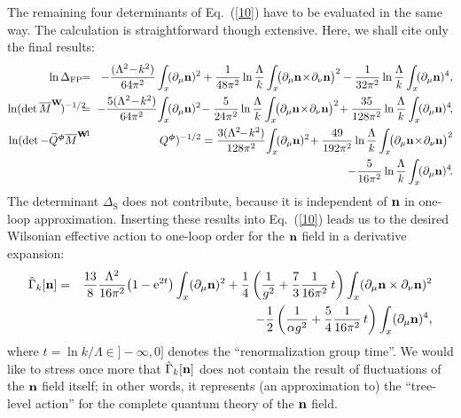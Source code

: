 \documentclass[a4paper,12pt]{article}
\newcommand{\E}{\text{e}}
\newcommand{\re}[1]{~(\ref{#1})}
\begin{document}
The remaining four determinants of Eq.\re{10} have to be evaluated in
the same way. The calculation is straightforward though
extensive. Here, we shall cite only the final results:
\begin{eqnarray}
\ln \Delta_{\text{FP}}\!\!&=&\!\! 
-\frac{(\Lambda^2\!-\!k^2)}{64\pi^2} \int_x \!(\partial_\mu\mn)^2 
+ \frac{1}{48\pi^2} \ln \frac{\Lambda}{k}\int_x\!  
  \bigl(\partial_\mu\mn\!\times\!\partial_\nu\mn\bigr)^2 
- \frac{1}{32\pi^2} \ln\frac{\Lambda}{k} \int_x \!(\partial_\mu\mn)^4,
\nonumber\\
\ln (\det\overline{M}^{\mW}\!)^{-1/2}\!\!\!\!
&=&\!\!\! -\frac{5 (\Lambda^2\!-\!k^2)}{64\pi^2}\! \int_x\!
  (\partial_\mu\mn)^2 \!
- \frac{5}{24\pi^2} \ln \frac{\Lambda}{k} \int_x \!
\bigl(\partial_\mu\mn\!\times\!\partial_\nu\mn\bigr)^2 \!
+ \frac{35}{128\pi^2} \ln\frac{\Lambda}{k} \int_x
  \!(\partial_\mu\mn)^4\!, 
\nonumber\\
\ln(\det-\widetilde{Q}^{\mF}\overline{M}^{\mW}
\!\!\!\!\!&{}^{{}^{\scriptstyle -1}}&\!\!\!\!\!Q^{\mF})^{-1/2} 
= \frac{3  (\Lambda^2\!\!-\!k^2)}{128\pi^2}\! \int_x\! 
  (\partial_\mu\mn)^2 \!
+ \frac{49}{192\pi^2} \ln \frac{\Lambda}{k} \int_x \!
\bigl(\partial_\mu\mn\!\times\!\partial_\nu\mn\bigr)^2 \nonumber\\
&&\qquad\qquad\,\,- \frac{5}{16\pi^2} \ln\frac{\Lambda}{k} \int_x
  \!(\partial_\mu\mn)^4\!. 
\label{13}
\end{eqnarray}
The determinant $\Delta_{\text{S}}$ does not contribute, because it is
independent of $\mathbf{n}$ in one-loop approximation. Inserting these
results into Eq.\re{10} leads us to the desired Wilsonian effective
action to one-loop order for the $\mathbf{n}$ field in a derivative
expansion:
\begin{eqnarray}
\hat{\Gamma}_k[\mn] &=& \frac{13}{8} \frac{\Lambda^2}{16\pi^2} \bigl(
1-\E^{2t}\bigr) \int_x (\partial_\mu \mn)^2 + \frac{1}{4} \left(
  \frac{1}{g^2} + \frac{7}{3} \frac{1}{16\pi^2} \,t\right)
\int_x(\partial_\mu\mn \times \partial_\nu \mn)^2 \nonumber\\
&&-\frac{1}{2} \left( \frac{1}{\alpha g^2} + \frac{5}{4}
  \frac{1}{16\pi^2} \, t\right) \int_x (\partial_\mu \mn)^4,
\label{14}
\end{eqnarray}
where $t=\ln k/\Lambda\in ]-\infty,0]$ denotes the ``renormalization
group time''. We would like to stress once more that
$\hat{\Gamma}_k[\mathbf{n}]$ does not contain the result of fluctuations of
the $\mathbf{n}$ field itself; in other words, it represents (an
approximation to) the ``tree-level action'' for the complete quantum
theory of the $\mathbf{n}$ field. 
\end{document}
